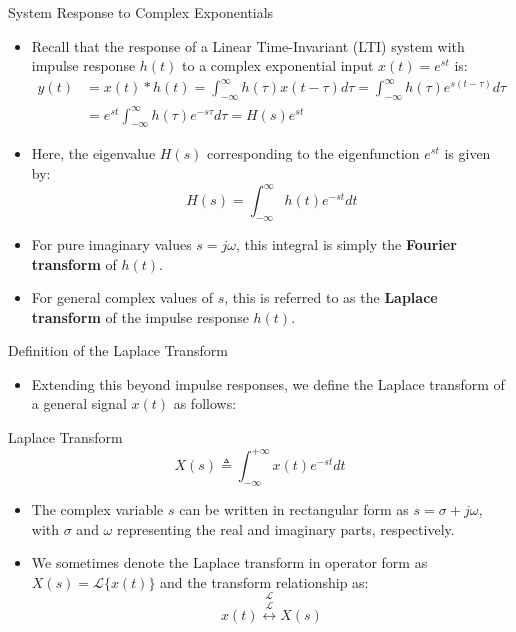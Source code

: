 \begin{frame}{System Response to Complex Exponentials}
    \begin{itemize}
        \item Recall that the response of a Linear Time-Invariant (LTI) system with impulse response $h(t)$ to a complex exponential input $x(t) = e^{st}$ is:
              \begin{align*}
                  y(t) & = x(t) * h(t) = \int_{-\infty}^{\infty} h(\tau) x(t-\tau) d\tau = \int_{-\infty}^{\infty} h(\tau) e^{s(t-\tau)} d\tau \\
                       & = e^{st} \int_{-\infty}^{\infty} h(\tau) e^{-s\tau} d\tau = H(s)e^{st}
              \end{align*}
        \item Here, the eigenvalue $H(s)$ corresponding to the eigenfunction $e^{st}$ is given by:
              \begin{equation*}
                  H(s) = \int_{-\infty}^{\infty} h(t) e^{-st} dt
              \end{equation*}
        \item For pure imaginary values $s = j\omega$, this integral is simply the \textbf{Fourier transform} of $h(t)$.
        \item For general complex values of $s$, this is referred to as the \textbf{Laplace transform} of the impulse response $h(t)$.
    \end{itemize}
\end{frame}

\begin{frame}{Definition of the Laplace Transform}
    \begin{itemize}
        \item Extending this beyond impulse responses, we define the Laplace transform of a general signal $x(t)$ as follows:
    \end{itemize}

    \vspace{0.2cm}
    \begin{conceptbox}{Laplace Transform}
        \vspace{-0.2cm}
        \begin{equation*}
            X(s) \triangleq \int_{-\infty}^{+\infty} x(t) e^{-st} dt
        \end{equation*}
    \end{conceptbox}

    \begin{itemize}
        \item The complex variable $s$ can be written in rectangular form as $s = \sigma + j\omega$, with $\sigma$ and $\omega$ representing the real and imaginary parts, respectively.
        \item We sometimes denote the Laplace transform in operator form as $X(s) = \mathcal{L}\{x(t)\}$ and the transform relationship as:
              \begin{equation*}
                  x(t) \stackrel{\mathcal{L}}{\overset{{\mathcal{L}}}{\longleftrightarrow}} X(s)
              \end{equation*}
    \end{itemize}
\end{frame}

